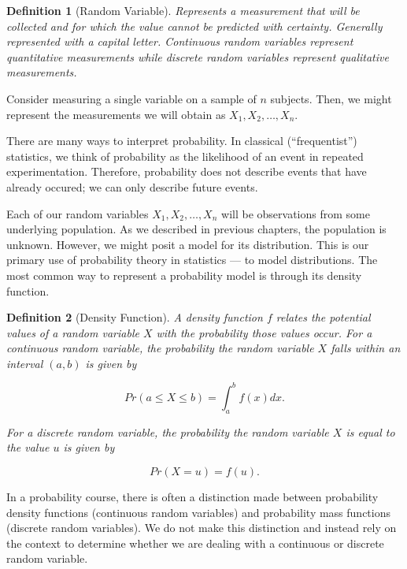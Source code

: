 \documentclass[
]{book}
\theoremstyle{plain}
\theoremstyle{mydefn}
\newtheorem{definition}{Definition}[chapter]
\theoremstyle{myexmpl}
\theoremstyle{remark}
\begin{document}
\begin{definition}[Random Variable]
\protect\hypertarget{def:defn-random-variable}{}{\label{def:defn-random-variable} {} }Represents a measurement that will be collected and for which the value cannot be predicted with certainty. Generally represented with a capital letter. Continuous random variables represent quantitative measurements while discrete random variables represent qualitative measurements.
\end{definition}

Consider measuring a single variable on a sample of \(n\) subjects. Then, we might represent the measurements we will obtain as \(X_1, X_2, \dots, X_n\).

\begin{rmdtip}
There are many ways to interpret probability. In classical (``frequentist'') statistics, we think of probability as the likelihood of an event in repeated experimentation. Therefore, probability does not describe events that have already occured; we can only describe future events.\\
\end{rmdtip}

Each of our random variables \(X_1, X_2, \dotsc, X_n\) will be observations from some underlying population. As we described in previous chapters, the population is unknown. However, we might posit a model for its distribution. This is our primary use of probability theory in statistics --- to model distributions. The most common way to represent a probability model is through its density function.

\begin{definition}[Density Function]
\protect\hypertarget{def:defn-density}{}{\label{def:defn-density} {} }A density function \(f\) relates the potential values of a random variable \(X\) with the probability those values occur. For a \emph{continuous} random variable, the probability the random variable \(X\) falls within an interval \((a, b)\) is given by

\[Pr(a \leq X \leq b) = \int_{a}^{b} f(x) dx.\]

For a \emph{discrete} random variable, the probability the random variable \(X\) is equal to the value \(u\) is given by

\[Pr(X = u) = f(u).\]
\end{definition}

\begin{rmdtip}
In a probability course, there is often a distinction made between probability density functions (continuous random variables) and probability mass functions (discrete random variables). We do not make this distinction and instead rely on the context to determine whether we are dealing with a continuous or discrete random variable.
\end{rmdtip}
\end{document}
